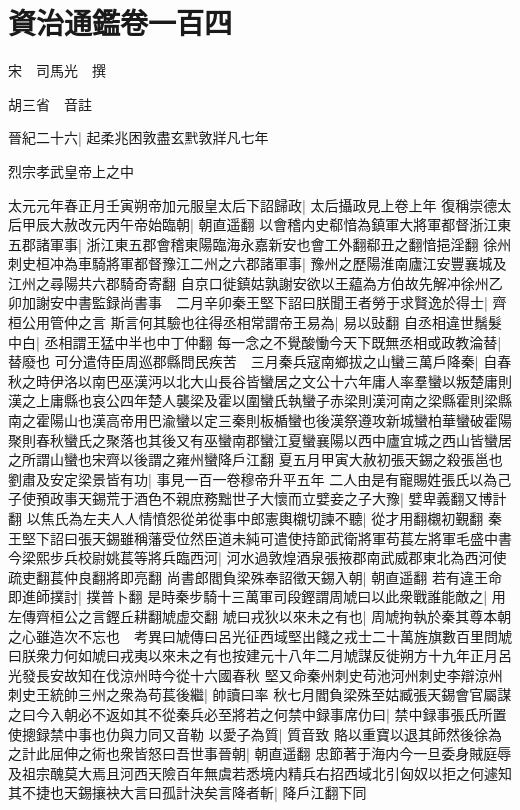 \section{資治通鑑卷一百四}
宋　司馬光　撰

胡三省　音註

晉紀二十六|{
	起柔兆困敦盡玄黓敦牂凡七年}


烈宗孝武皇帝上之中

太元元年春正月壬寅朔帝加元服皇太后下詔歸政|{
	太后攝政見上卷上年}
復稱崇德太后甲辰大赦改元丙午帝始臨朝|{
	朝直遥翻}
以會稽内史郗愔為鎮軍大將軍都督浙江東五郡諸軍事|{
	浙江東五郡會稽東陽臨海永嘉新安也會工外翻郗丑之翻愔挹淫翻}
徐州刺史桓冲為車騎將軍都督豫江二州之六郡諸軍事|{
	豫州之歷陽淮南廬江安豐襄城及江州之尋陽共六郡騎奇寄翻}
自京口徙鎮姑孰謝安欲以王藴為方伯故先解冲徐州乙卯加謝安中書監録尚書事　二月辛卯秦王堅下詔曰朕聞王者勞于求賢逸於得士|{
	齊桓公用管仲之言}
斯言何其驗也往得丞相常謂帝王易為|{
	易以䜴翻}
自丞相違世鬚髮中白|{
	丞相謂王猛中半也中丁仲翻}
每一念之不覺酸慟今天下既無丞相或政教淪替|{
	替廢也}
可分遣侍臣周巡郡縣問民疾苦　三月秦兵寇南鄉拔之山蠻三萬戶降秦|{
	自春秋之時伊洛以南巴巫漢沔以北大山長谷皆蠻居之文公十六年庸人率羣蠻以叛楚庸則漢之上庸縣也哀公四年楚人襲梁及霍以圍蠻氏執蠻子赤梁則漢河南之梁縣霍則梁縣南之霍陽山也漢高帝用巴渝蠻以定三秦則板楯蠻也後漢祭遵攻新城蠻柏華蠻破霍陽聚則春秋蠻氏之聚落也其後又有巫蠻南郡蠻江夏蠻襄陽以西中廬宜城之西山皆蠻居之所謂山蠻也宋齊以後謂之雍州蠻降戶江翻}
夏五月甲寅大赦初張天錫之殺張邕也劉肅及安定梁景皆有功|{
	事見一百一卷穆帝升平五年}
二人由是有寵賜姓張氏以為己子使預政事天錫荒于酒色不親庶務黜世子大懷而立嬖妾之子大豫|{
	嬖卑義翻又博計翻}
以焦氏為左夫人人情憤怨從弟從事中郎憲輿櫬切諫不聽|{
	從才用翻櫬初覲翻}
秦王堅下詔曰張天錫雖稱藩受位然臣道未純可遣使持節武衛將軍苟萇左將軍毛盛中書今梁熙步兵校尉姚萇等將兵臨西河|{
	河水過敦煌酒泉張掖郡南武威郡東北為西河使疏吏翻萇仲良翻將即亮翻}
尚書郎閻負梁殊奉詔徵天錫入朝|{
	朝直遥翻}
若有違王命即進師撲討|{
	撲普卜翻}
是時秦步騎十三萬軍司段鏗謂周虓曰以此衆戰誰能敵之|{
	用左傳齊桓公之言鏗丘耕翻虓虚交翻}
虓曰戎狄以來未之有也|{
	周虓拘執於秦其尊本朝之心雖造次不忘也　考異曰虓傳曰呂光征西域堅出餞之戎士二十萬旌旗數百里問虓曰朕衆力何如虓曰戎夷以來未之有也按建元十八年二月虓謀反徙朔方十九年正月呂光發長安故知在伐涼州時今從十六國春秋}
堅又命秦州刺史苟池河州刺史李辯涼州刺史王統帥三州之衆為苟萇後繼|{
	帥讀曰率}
秋七月閻負梁殊至姑臧張天錫會官屬謀之曰今入朝必不返如其不從秦兵必至將若之何禁中録事席仂曰|{
	禁中録事張氏所置使摠録禁中事也仂與力同又音勒}
以愛子為質|{
	質音致}
賂以重寶以退其師然後徐為之計此屈伸之術也衆皆怒曰吾世事晉朝|{
	朝直遥翻}
忠節著于海内今一旦委身賊庭辱及祖宗醜莫大焉且河西天險百年無虞若悉境内精兵右招西域北引匈奴以拒之何遽知其不捷也天錫攘袂大言曰孤計決矣言降者斬|{
	降戶江翻下同}
